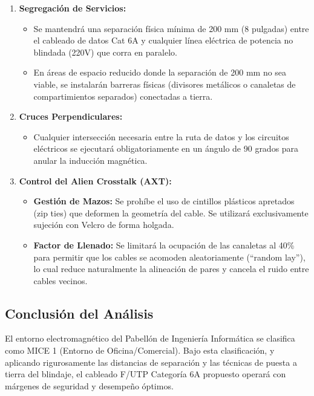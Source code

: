 \begin{enumerate}
    \item \textbf{Segregación de Servicios:}
    \begin{itemize}
        \item Se mantendrá una separación física mínima de 200 mm (8 pulgadas) entre el cableado de datos Cat 6A y cualquier línea eléctrica de potencia no blindada (220V) que corra en paralelo.
        \item En áreas de espacio reducido donde la separación de 200 mm no sea viable, se instalarán barreras físicas (divisores metálicos o canaletas de compartimientos separados) conectadas a tierra.
    \end{itemize}
    \item \textbf{Cruces Perpendiculares:}
    \begin{itemize}
        \item Cualquier intersección necesaria entre la ruta de datos y los circuitos eléctricos se ejecutará obligatoriamente en un ángulo de 90 grados para anular la inducción magnética.
    \end{itemize}
    \item \textbf{Control del Alien Crosstalk (AXT):}
    \begin{itemize}
        \item \textbf{Gestión de Mazos:} Se prohíbe el uso de cintillos plásticos apretados (zip ties) que deformen la geometría del cable. Se utilizará exclusivamente sujeción con Velcro de forma holgada.
        \item \textbf{Factor de Llenado:} Se limitará la ocupación de las canaletas al 40\% para permitir que los cables se acomoden aleatoriamente (``random lay''), lo cual reduce naturalmente la alineación de pares y cancela el ruido entre cables vecinos.
    \end{itemize}
\end{enumerate}

\subsection*{Conclusión del Análisis}

El entorno electromagnético del Pabellón de Ingeniería Informática se clasifica como MICE 1 (Entorno de Oficina/Comercial). Bajo esta clasificación, y aplicando rigurosamente las distancias de separación y las técnicas de puesta a tierra del blindaje, el cableado F/UTP Categoría 6A propuesto operará con márgenes de seguridad y desempeño óptimos.

